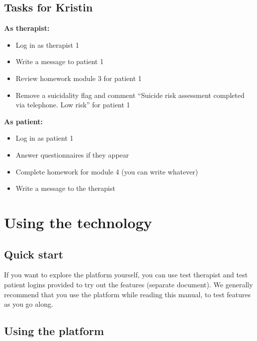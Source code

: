 \documentclass[]{book}
\providecommand{\tightlist}{%
  \setlength{\itemsep}{0pt}\setlength{\parskip}{0pt}}
\theoremstyle{definition}
\theoremstyle{definition}
\theoremstyle{definition}
\theoremstyle{remark}
\begin{document}
\hypertarget{tasks-for-kristin}{%
\section{Tasks for Kristin}\label{tasks-for-kristin}}

\textbf{As therapist:}

\begin{itemize}
\tightlist
\item
  Log in as therapist 1
\item
  Write a message to patient 1
\item
  Review homework module 3 for patient 1
\item
  Remove a suicidality flag and comment ``Suicide risk assessment
  completed via telephone. Low risk'' for patient 1
\end{itemize}

\textbf{As patient:}

\begin{itemize}
\tightlist
\item
  Log in as patient 1
\item
  Answer questionnaires if they appear
\item
  Complete homework for module 4 (you can write whatever)
\item
  Write a message to the therapist
\end{itemize}

\hypertarget{using-the-technology}{%
\chapter{Using the technology}\label{using-the-technology}}

\hypertarget{quick-start}{%
\section{Quick start}\label{quick-start}}

If you want to explore the platform yourself, you can use test therapist
and test patient logins provided to try out the features (separate
document). We generally recommend that you use the platform while
reading this manual, to test features as you go along.

\hypertarget{using-the-platform}{%
\section{Using the platform}\label{using-the-platform}}
\end{document}
